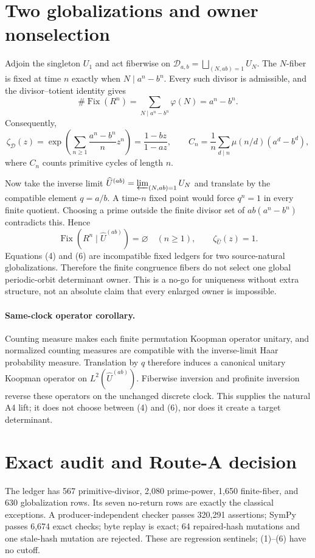 \documentclass[10pt]{article}
\begin{document}
\section{Two globalizations and owner nonselection}
Adjoin the singleton $U_1$ and act fiberwise on
$\mathcal D_{a,b}=\bigsqcup_{(N,ab)=1}U_N$.  The $N$-fiber is fixed at time
$n$ exactly when $N\mid a^n-b^n$.  Every such divisor is admissible, and the
divisor--totient identity gives
\[
\#\operatorname{Fix}(R^n)=\sum_{N\mid a^n-b^n}\varphi(N)=a^n-b^n.\tag{4}
\]
Consequently,
\[
\zeta_{\mathcal D}(z)
=\exp\!\left(\sum_{n\ge1}\frac{a^n-b^n}{n}z^n\right)
=\frac{1-bz}{1-az},\qquad
C_n=\frac1n\sum_{d\mid n}\mu(n/d)(a^d-b^d),\tag{5}
\]
where $C_n$ counts primitive cycles of length $n$.

Now take the inverse limit
$\widehat U^{(ab)}=\varprojlim_{(N,ab)=1}U_N$ and translate by the compatible
element $q=a/b$.  A time-$n$ fixed point would force $q^n=1$ in every
finite quotient.  Choosing a prime outside the finite divisor set of
$ab(a^n-b^n)$ contradicts this.  Hence
\[
\operatorname{Fix}(R^n\mid\widehat U^{(ab)})=\varnothing\quad(n\ge1),
\qquad \zeta_{\widehat U}(z)=1.\tag{6}
\]
Equations (4) and (6) are incompatible fixed ledgers for two source-natural
globalizations.  Therefore the finite congruence fibers do not select one
global periodic-orbit determinant owner.  This is a no-go for uniqueness
without extra structure, not an absolute claim that every enlarged owner is
impossible.

\paragraph{Same-clock operator corollary.}
Counting measure makes each finite permutation Koopman operator unitary, and
normalized counting measures are compatible with the inverse-limit Haar
probability measure.  Translation by $q$ therefore induces a canonical
unitary Koopman operator on $L^2(\widehat U^{(ab)})$.  Fiberwise inversion and
profinite inversion reverse these operators on the unchanged discrete
clock.  This supplies the natural A4 lift; it does not choose between (4)
and (6), nor does it create a target determinant.

\section{Exact audit and Route-A decision}
The ledger has 567 primitive-divisor, 2,080 prime-power, 1,650 finite-fiber,
and 630 globalization rows.  Its seven no-return rows are exactly the
classical exceptions.  A producer-independent checker passes 320,291
assertions; SymPy passes 6,674 exact checks; byte replay is exact; 64
repaired-hash mutations and one stale-hash mutation are rejected.  These are
regression sentinels; (1)--(6) have no cutoff.
\end{document}
